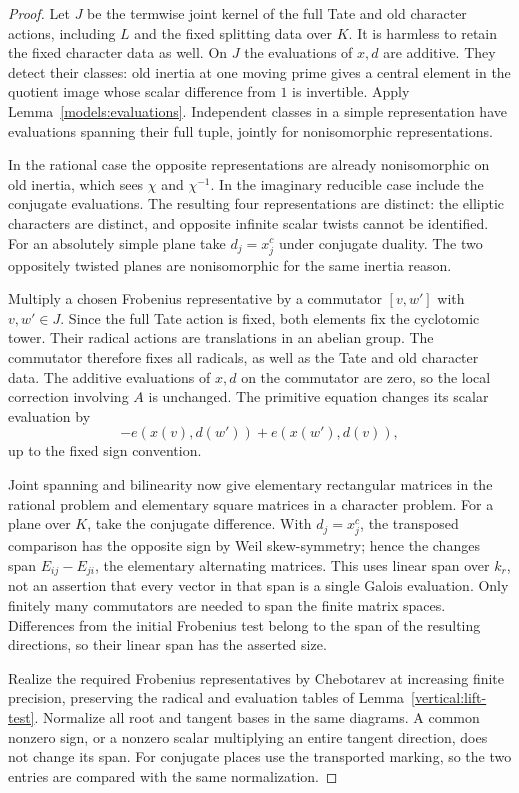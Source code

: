\begin{proof}
Let $J$ be the termwise joint kernel of the full Tate and old
character actions, including $L$ and the fixed splitting data
over $K$.  It is harmless to retain the fixed character data
as well.  On $J$ the evaluations of $x,d$ are additive.
They detect their classes: old inertia at one moving prime
gives a central element in the quotient image whose scalar
difference from $1$ is invertible.  Apply
Lemma~\ref{models:evaluations}.  Independent classes in a simple
representation have evaluations spanning their full tuple,
jointly for nonisomorphic representations.

In the rational case the opposite representations are already
nonisomorphic on old inertia, which sees $\chi$ and $\chi^{-1}$.
In the imaginary reducible case include the conjugate evaluations.
The resulting four representations are distinct: the elliptic
characters are distinct, and opposite infinite scalar twists
cannot be identified.  For an absolutely simple plane take
$d_j=x_j^c$ under conjugate duality.  The two oppositely twisted
planes are nonisomorphic for the same inertia reason.

Multiply a chosen Frobenius representative by a commutator
$[v,w']$ with $v,w'\in J$.  Since the full Tate action is fixed,
both elements fix the cyclotomic tower.  Their radical actions
are translations in an abelian group.  The commutator therefore
fixes all radicals, as well as the Tate and old character data.
The additive evaluations of $x,d$ on the commutator are zero,
so the local correction involving $A$ is unchanged.  The
primitive equation changes its scalar evaluation by
\begin{equation}\label{vertical:commutator-change}
 -e(x(v),d(w'))+e(x(w'),d(v)),
\end{equation}
up to the fixed sign convention.

Joint spanning and bilinearity now give elementary rectangular
matrices in the rational problem and elementary square matrices
in a character problem.  For a plane over $K$, take the
conjugate difference.  With $d_j=x_j^c$, the transposed
comparison has the opposite sign by Weil skew-symmetry; hence
the changes span $E_{ij}-E_{ji}$, the elementary alternating
matrices.  This uses linear span over $k_r$, not an assertion
that every vector in that span is a single Galois evaluation.
Only finitely many commutators are needed to span the finite
matrix spaces.  Differences from the initial Frobenius test
belong to the span of the resulting directions, so their
linear span has the asserted size.

Realize the required Frobenius representatives by Chebotarev at
increasing finite precision, preserving the radical and
evaluation tables of Lemma~\ref{vertical:lift-test}.  Normalize
all root and tangent bases in the same diagrams.  A common
nonzero sign, or a nonzero scalar multiplying an entire tangent
direction, does not change its span.  For conjugate places use
the transported marking, so the two entries are compared with
the same normalization.
\end{proof}

